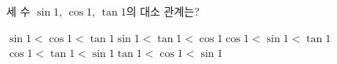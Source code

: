 세 수 $\sin 1$, $\cos 1$, $\tan 1$의 대소 관계는?
\begin{choicesii}{$\sin 1<\cos 1<\tan 1$}{$\sin 1<\tan 1<\cos 1$}{$\cos 1<\sin 1<\tan 1$}{$\cos 1<\tan 1<\sin 1$}{$\tan 1<\cos 1<\sin 1$}\end{choicesii}
